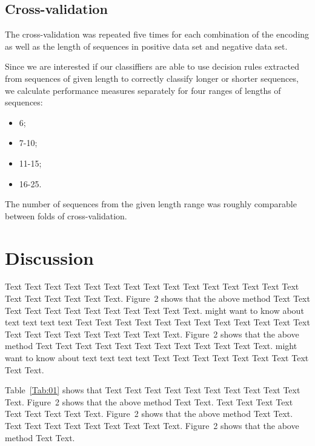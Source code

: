 \documentclass{bioinfo}
\begin{document}
\begin{methods}
\subsection{Cross-validation}

The cross-validation was repeated five times for each combination of the encoding as well as the length of sequences in positive data set and negative data set.

Since we are interested if our classiffiers are able to use decision rules extracted from sequences of given length to correctly classify longer or shorter sequences, we calculate performance measures separately for four ranges of lengths of sequences:  
\begin{itemize}
\item 6;  
\item 7-10;   
\item 11-15;   
\item 16-25.  
\end{itemize}
The number of sequences from the given length range was roughly comparable between folds of cross-validation.


\section{Discussion}

Text Text Text Text Text Text  Text Text Text Text Text Text Text
Text Text  Text Text Text Text Text Text.
Figure~2\vphantom{\ref{fig:02}} shows that the above method  Text
Text Text Text  Text Text Text Text Text Text  Text Text.
\citealp{Boffelli03} might want to know about  text text text text
Text Text Text Text Text Text  Text Text Text Text Text Text Text
Text Text  Text Text Text Text Text Text.
Figure~2\vphantom{\ref{fig:02}} shows that the above method  Text
Text Text Text  Text Text Text Text Text Text  Text Text.
\citealp{Boffelli03} might want to know about  text text text text
Text Text Text Text Text Text Text Text Text Text.




Table~\ref{Tab:01} shows that Text Text Text Text Text  Text Text
Text Text Text Text. Figure~2\vphantom{\ref{fig:02}} shows that
the above method Text Text. Text Text Text  Text Text Text Text
Text Text. Figure~2\vphantom{\ref{fig:02}} shows that the above
method Text Text. Text Text Text  Text Text Text Text Text Text.
Figure~2\vphantom{\ref{fig:02}} shows that the above method Text
Text.










\end{methods}
\end{document}
